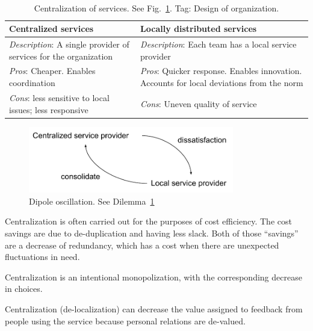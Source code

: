 \ \\

\begin{center}
\begin{table}[ht]
\begin{tabular}{ | m{\dilemmatablewidth}| m{\dilemmatablewidth} | } 
  \hline
  \textbf{Centralized services} &
  \textbf{Locally distributed services} \\
  \hline
  \textit{Description}: A single provider of services for the organization &
  \textit{Description}: Each team has a local service provider \\  
  \hline
  \textit{Pros}: Cheaper. Enables coordination &
  \textit{Pros}: Quicker response. 
  Enables innovation. 
  Accounts for local deviations from the norm \\
  \hline
  \textit{Cons}: less sensitive to local issues; less responsive & 
  \textit{Cons}: Uneven quality of service \\
  \hline
\end{tabular}
\caption{Centralization of services. 
See Fig.~\ref{fig:central-vs-distributed}.
{\tiny Tag: Design of organization.}
}
\label{table:central-vs-distributed}
\end{table}
\end{center}

\begin{figure}[ht]
    \centering
    \includegraphics[width=0.8\textwidth]{images/dilemma_centralization-vs-distributed.pdf}
    \caption{Dipole oscillation. See Dilemma~\ref{table:central-vs-distributed}}
    \label{fig:central-vs-distributed}
\end{figure}

Centralization is often carried out for the purposes of cost efficiency. The cost savings are due to de-duplication and having less slack. Both of those ``savings'' are a decrease of redundancy, which has a cost when there are unexpected fluctuations in need. 

Centralization is an intentional monopolization, with the corresponding decrease in choices. 

Centralization (de-localization) can decrease the value assigned to feedback from people using the service because personal relations are de-valued. 

